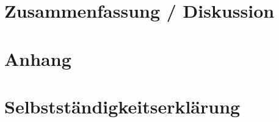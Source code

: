 \documentclass[english,12pt,doc]{apa}
\begin{document}
\section{Zusammenfassung / Diskussion} 


\blindtext

\newpage
 

\newpage
\section{Anhang}
\blindtext
\newpage
\section{Selbstständigkeitserklärung}
\blindtext

\end{document}

